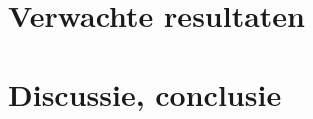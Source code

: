 \documentclass{hogent-article}
\begin{document}

\lipsum[10-12]

\section{Verwachte resultaten}%
\label{sec:verwachte-resultaten}


\lipsum[14-18]

\section{Discussie, conclusie}%
\label{sec:discussie-conclusie}

\lipsum[19-21]


\printbibliography[heading=bibintoc]
\end{document}
